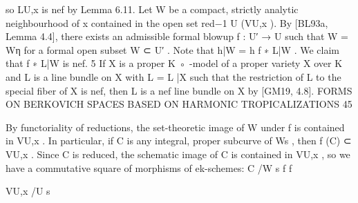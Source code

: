 \documentclass[
  10pt,
]{article}
\newenvironment{Shaded}{}{}
\newcommand{\NormalTok}[1]{#1}
\begin{document}
\begin{Shaded}
\begin{Highlighting}[]
\NormalTok{so LU,x is nef by Lemma 6.11. Let W be a compact, strictly analytic neighbourhood of x}
\NormalTok{contained in the open set red−1 U}
\NormalTok{                                    (VU,x ). By [BL93a, Lemma 4.4], there exists an admissible}
\NormalTok{formal blowup f : U′ → U such that W = Wη for a formal open subset W ⊂ U′ . Note that}
\NormalTok{h|W = h f ∗ L|W . We claim that f ∗ L|W is nef.}
\NormalTok{     5}
\NormalTok{    If X is a proper K ◦ {-}model of a proper variety X over K and L is a line bundle on X with L = L |X}
\NormalTok{such that the restriction of L to the special fiber of X is nef, then L is a nef line bundle on X by [GM19,}
\NormalTok{4.8].}
\NormalTok{              FORMS ON BERKOVICH SPACES BASED ON HARMONIC TROPICALIZATIONS                 45}

\NormalTok{  By functoriality of reductions, the set{-}theoretic image of W under f is contained in}
\NormalTok{VU,x . In particular, if C is any integral, proper subcurve of Ws , then f (C) ⊂ VU,x . Since}
\NormalTok{C is reduced, the schematic image of C is contained in VU,x , so we have a commutative}
\NormalTok{square of morphisms of ek{-}schemes:}
\NormalTok{                                            C    /W}
\NormalTok{                                                       s}
\NormalTok{                                        f              f}
                                                  
\NormalTok{                                        VU,x     /U}
\NormalTok{                                                       s}


\end{Highlighting}
\end{Shaded}
\end{document}
